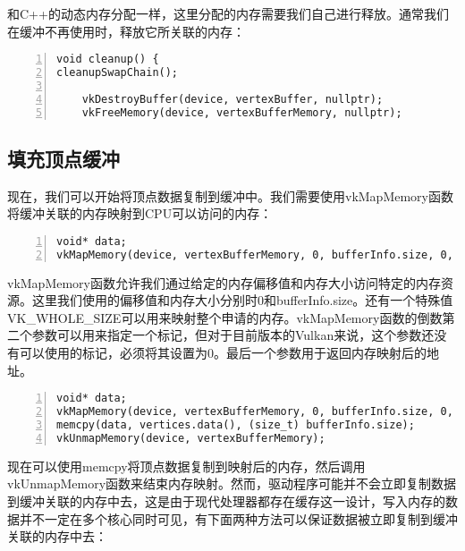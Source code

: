 \documentclass{ctexart}
\begin{document}
和C++的动态内存分配一样，这里分配的内存需要我们自己进行释放。通常我们在缓冲不再使用时，释放它所关联的内存：

\begin{lstlisting}[language={[ANSI]C},keywordstyle=\color{blue!70},commentstyle=\color{red!50!green!50!blue!50},frame=shadowbox, rulesepcolor=\color{red!20!green!20!blue!20},basicstyle=\small,numbers=left, numberstyle=\tiny,breaklines=true]
void cleanup() {
cleanupSwapChain();

	vkDestroyBuffer(device, vertexBuffer, nullptr);
	vkFreeMemory(device, vertexBufferMemory, nullptr);
\end{lstlisting}

\subsection{填充顶点缓冲}

现在，我们可以开始将顶点数据复制到缓冲中。我们需要使用vkMapMemory函数将缓冲关联的内存映射到CPU可以访问的内存：

\begin{lstlisting}[language={[ANSI]C},keywordstyle=\color{blue!70},commentstyle=\color{red!50!green!50!blue!50},frame=shadowbox, rulesepcolor=\color{red!20!green!20!blue!20},basicstyle=\small,numbers=left, numberstyle=\tiny,breaklines=true]
void* data;
vkMapMemory(device, vertexBufferMemory, 0, bufferInfo.size, 0, &data);
\end{lstlisting}

vkMapMemory函数允许我们通过给定的内存偏移值和内存大小访问特定的内存资源。这里我们使用的偏移值和内存大小分别时0和bufferInfo.size。还有一个特殊值VK\_WHOLE\_SIZE可以用来映射整个申请的内存。vkMapMemory函数的倒数第二个参数可以用来指定一个标记，但对于目前版本的Vulkan来说，这个参数还没有可以使用的标记，必须将其设置为0。最后一个参数用于返回内存映射后的地址。

\begin{lstlisting}[language={[ANSI]C},keywordstyle=\color{blue!70},commentstyle=\color{red!50!green!50!blue!50},frame=shadowbox, rulesepcolor=\color{red!20!green!20!blue!20},basicstyle=\small,numbers=left, numberstyle=\tiny,breaklines=true]
void* data;
vkMapMemory(device, vertexBufferMemory, 0, bufferInfo.size, 0, &data);
memcpy(data, vertices.data(), (size_t) bufferInfo.size);
vkUnmapMemory(device, vertexBufferMemory);
\end{lstlisting}

现在可以使用memcpy将顶点数据复制到映射后的内存，然后调用vkUnmapMemory函数来结束内存映射。然而，驱动程序可能并不会立即复制数据到缓冲关联的内存中去，这是由于现代处理器都存在缓存这一设计，写入内存的数据并不一定在多个核心同时可见，有下面两种方法可以保证数据被立即复制到缓冲关联的内存中去：
\end{document}
